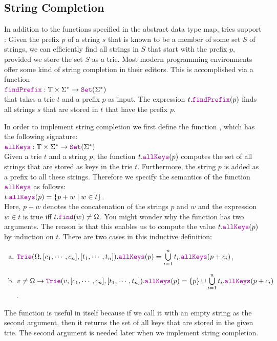 \subsection{String Completion}
In addition to the functions specified in the abstract data type map, tries support
:  Given the prefix $p$ of a string $s$ that is known to be a
member of some set $S$ of strings, we can efficiently find all strings in $S$ that start with the prefix $p$, provided we
store the set $S$ as a trie.  Most modern programming environments offer some kind of string completion in
their editors.  This is accomplished via a function
\\[0.2cm]
\hspace*{1.3cm}
$\mytt{findPrefix}:\mathbb{T} \times \Sigma^* \rightarrow \mytt{Set}(\Sigma^*)$
\\[0.2cm]
that takes a trie $t$ and a prefix $p$ as input.  The expression $t.\mytt{findPrefix}(p)$ finds all
strings $s$ that are stored in $t$ that have the prefix $p$.

In order to implement string completion we first define the function , which
has the following signature:
\\[0.2cm]
\hspace*{1.3cm}
$\mytt{allKeys}: \mathbb{T} \times \Sigma^* \rightarrow \mytt{Set}(\Sigma^*)$
\\[0.2cm]
Given a trie $t$ and a string $p$, the function $t.\mytt{allKeys}(p)$ computes the set of all strings that
are stored as keys in the trie $t$.  Furthermore, the string $p$ is added as a prefix to all these strings.
Therefore we specify the semantics of the function $\mytt{allKeys}$ as follows:
\\[0.2cm]
\hspace*{1.3cm}
$t.\mytt{allKeys}(p) = \{ p+w \mid w \in t \}$.
\\[0.2cm]
Here, $p+w$ denotes the concatenation of the strings $p$ and $w$ and the expression $w \in t$ is true iff
$t.\mytt{find}(w) \not= \Omega$.  You might wonder why the function  has two arguments.  The
reason is that this enables us to compute the value $t.\mytt{allKeys}(p)$ by induction on $t$.  There are two
cases in this inductive definition:  
\begin{enumerate}[(a)]
\item $\mytt{Trie}(\Omega, [c_1, \cdots, c_n], [t_1,\cdots,t_n]).\mytt{allKeys}(p) = 
       \bigcup\limits_{i=1}^n t_i.\mytt{allKeys}(p+c_i) 
      $,
\item $v \not= \Omega \rightarrow 
       \mytt{Trie}(v, [c_1, \cdots, c_n], [t_1,\cdots,t_n]).\mytt{allKeys}(p) = 
       \{p\} \cup \bigcup\limits_{i=1}^n t_i.\mytt{allKeys}(p+c_i) 
      $.
\end{enumerate}
The function  is useful in itself because if we call it with an empty string as the second
argument, then it returns the set of all keys that are stored in the given trie.  The second argument is needed
later when we implement string completion. 

